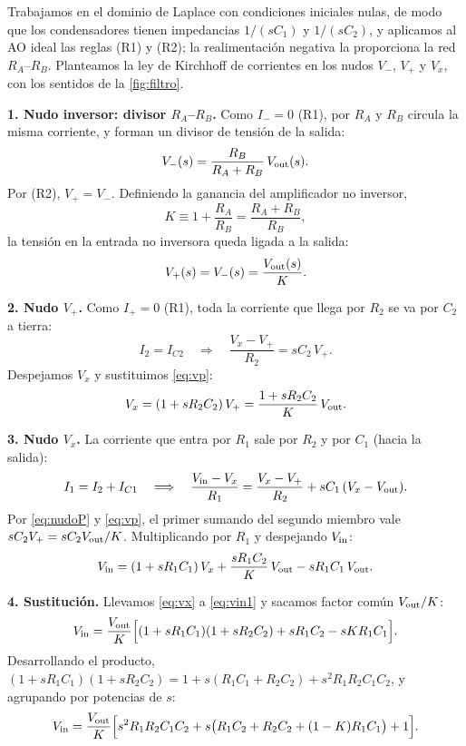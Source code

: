 \begin{resolucion}
Trabajamos en el dominio de Laplace con condiciones iniciales nulas, de modo que los condensadores tienen
impedancias $1/(sC_1)$ y $1/(sC_2)$, y aplicamos al AO ideal las reglas (R1) y (R2); la realimentación negativa
la proporciona la red $R_A$--$R_B$. Planteamos la ley de Kirchhoff de corrientes en los nudos $V_-$, $V_+$ y
$V_x$, con los sentidos de la \cref{fig:filtro}.

\textbf{1. Nudo inversor: divisor $R_A$--$R_B$.} Como $I_-=0$ (R1), por $R_A$ y $R_B$ circula la misma
corriente, y forman un divisor de tensión de la salida:
\begin{equation}\label{eq:vm}
  V_-(s)=\frac{R_B}{R_A+R_B}\,V_{\mathrm{out}}(s) .
\end{equation}
Por (R2), $V_+=V_-$. Definiendo la ganancia del amplificador no inversor,
\begin{equation}\label{eq:K}
  K\equiv1+\frac{R_A}{R_B}=\frac{R_A+R_B}{R_B},
\end{equation}
la tensión en la entrada no inversora queda ligada a la salida:
\begin{equation}\label{eq:vp}
  V_+(s)=V_-(s)=\frac{V_{\mathrm{out}}(s)}{K} .
\end{equation}

\textbf{2. Nudo $V_+$.} Como $I_+=0$ (R1), toda la corriente que llega por $R_2$ se va por $C_2$ a tierra:
\begin{equation}\label{eq:nudoP}
  I_2=I_{C2}\quad\Longrightarrow\quad\frac{V_x-V_+}{R_2}=sC_2\,V_+ .
\end{equation}
Despejamos $V_x$ y sustituimos \eqref{eq:vp}:
\begin{equation}\label{eq:vx}
  V_x=(1+sR_2C_2)\,V_+=\frac{1+sR_2C_2}{K}\,V_{\mathrm{out}} .
\end{equation}

\textbf{3. Nudo $V_x$.} La corriente que entra por $R_1$ sale por $R_2$ y por $C_1$ (hacia la salida):
\begin{equation}\label{eq:nudoX}
  I_1=I_2+I_{C1}\quad\Longrightarrow\quad\frac{V_{\mathrm{in}}-V_x}{R_1}=\frac{V_x-V_+}{R_2}+sC_1\,(V_x-V_{\mathrm{out}}) .
\end{equation}
Por \eqref{eq:nudoP} y \eqref{eq:vp}, el primer sumando del segundo miembro vale $sC_2V_+=sC_2V_{\mathrm{out}}/K$.
Multiplicando por $R_1$ y despejando $V_{\mathrm{in}}$:
\begin{equation}\label{eq:vin1}
  V_{\mathrm{in}}=(1+sR_1C_1)\,V_x+\frac{sR_1C_2}{K}\,V_{\mathrm{out}}-sR_1C_1\,V_{\mathrm{out}} .
\end{equation}

\textbf{4. Sustitución.} Llevamos \eqref{eq:vx} a \eqref{eq:vin1} y sacamos factor común $V_{\mathrm{out}}/K$:
\begin{equation}\label{eq:vin2}
  V_{\mathrm{in}}=\frac{V_{\mathrm{out}}}{K}\Bigl[(1+sR_1C_1)(1+sR_2C_2)+sR_1C_2-sK R_1C_1\Bigr] .
\end{equation}
Desarrollando el producto, $(1+sR_1C_1)(1+sR_2C_2)=1+s(R_1C_1+R_2C_2)+s^{2}R_1R_2C_1C_2$, y agrupando por
potencias de $s$:
\begin{equation}\label{eq:vin3}
  V_{\mathrm{in}}=\frac{V_{\mathrm{out}}}{K}\Bigl[s^{2}R_1R_2C_1C_2+s\bigl(R_1C_2+R_2C_2+(1-K)R_1C_1\bigr)+1\Bigr] .
\end{equation}


\end{resolucion}

